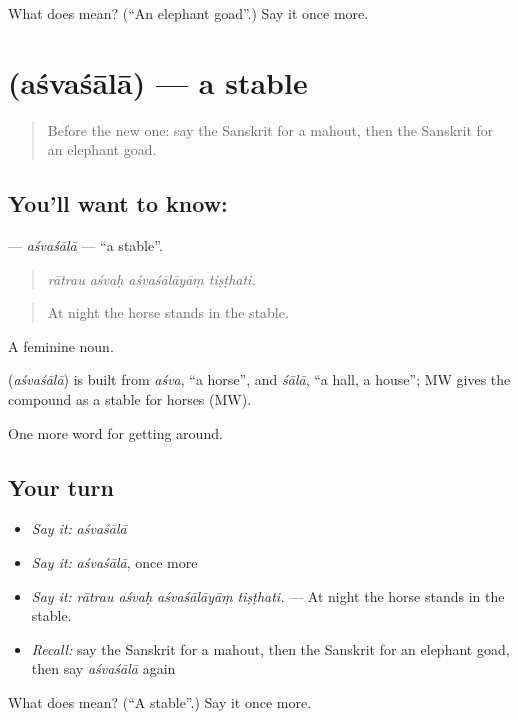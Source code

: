 \begin{tcolorbox}[breakable,colback=teal!4,colframe=teal!35!black,title={Before you move on}]
What does  mean? (\textquotedblleft{}An elephant goad\textquotedblright{}.) Say it once more.
\end{tcolorbox}
\section[\texorpdfstring{\sk{अश्वशाला} (aśvaśālā)}{अश्वशाला (aśvaśālā)}]{ (aśvaśālā) — a stable}

\label{lesson:SA-C408-asvasala}



\begin{quote}
Before the new one: say the Sanskrit for a mahout, then the Sanskrit for an elephant goad.
\end{quote}

\subsection*{You'll want to know: }
\textbf{} — \emph{aśvaśālā} — \textquotedblleft{}a stable\textquotedblright{}.

\begin{quote}
   
\end{quote}

\begin{quote}
\emph{rātrau aśvaḥ aśvaśālāyāṃ tiṣṭhati.}
\end{quote}

\begin{quote}
At night the horse stands in the stable.
\end{quote}

A feminine noun.

\begin{cousinweb}
\textbf{} (\emph{aśvaśālā}) is built from \emph{aśva}, \textquotedblleft{}a horse\textquotedblright{}, and \emph{śālā}, \textquotedblleft{}a hall, a house\textquotedblright{}; MW gives the compound as a stable for horses (MW).
\end{cousinweb}

\begin{grammarlens}[title={What you've built}]
One more word for getting around.
\end{grammarlens}

\subsection*{Your turn}
\begin{itemize}
\raggedright
  \item \emph{Say it:} \emph{aśvaśālā}
  \item \emph{Say it:} \emph{aśvaśālā}, once more
  \item \emph{Say it:} \emph{rātrau aśvaḥ aśvaśālāyāṃ tiṣṭhati.} — At night the horse stands in the stable.
  \item \emph{Recall:} say the Sanskrit for a mahout, then the Sanskrit for an elephant goad, then say \emph{aśvaśālā} again
\end{itemize}

\begin{tcolorbox}[breakable,colback=teal!4,colframe=teal!35!black,title={Before you move on}]
What does  mean? (\textquotedblleft{}A stable\textquotedblright{}.) Say it once more.
\end{tcolorbox}
